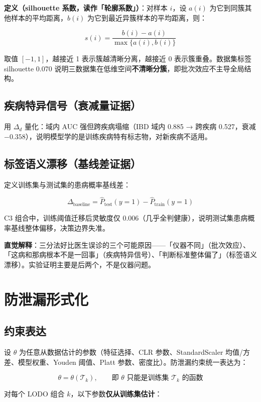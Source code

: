 \documentclass{internal-report}
\begin{document}
\textbf{定义（silhouette 系数，读作「轮廓系数」）}：对样本 $i$，设 $a(i)$ 为它到同簇其他样本的平均距离，$b(i)$ 为它到最近异簇样本的平均距离，则：

$$
s(i) = \frac{b(i) - a(i)}{\max\{a(i), b(i)\}}
$$

取值 $[-1,1]$，越接近 1 表示簇越清晰分离，越接近 0 表示簇重叠。数据集标签 silhouette 0.070 说明三数据集在低维空间\textbf{不清晰分簇}，即批次效应不主导全局结构。

\subsection{疾病特异信号（衰减量证据）}

用 $\Delta_d$ 量化：域内 AUC 强但跨疾病塌缩（IBD 域内 0.885 → 跨疾病 0.527，衰减 $-0.358$），说明模型学的是训练疾病特有标志物，对新疾病不适用。

\subsection{标签语义漂移（基线差证据）}

定义训练集与测试集的患病概率基线差：

$$
\Delta_{\text{baseline}} = \hat{P}_{\text{test}}(y=1) - \hat{P}_{\text{train}}(y=1)
$$

C3 组合中，训练阈值迁移后灵敏度仅 0.006（几乎全判健康），说明测试集患病概率基线整体偏移，决策边界失准。

\textbf{直觉解释}：三分法好比医生误诊的三个可能原因——「仪器不同」（批次效应）、「这病和那病根本不是一回事」（疾病特异信号）、「判断标准整体偏了」（标签语义漂移）。实验证明主要是后两个，不是仪器问题。

\section{防泄漏形式化}

\subsection{约束表达}

设 $\theta$ 为任意从数据估计的参数（特征选择、CLR 参数、StandardScaler 均值/方差、模型权重、Youden 阈值、Platt 参数、密度比）。防泄漏约束统一表达为：

$$
\theta = \theta(\mathcal{T}_k), \qquad \text{即 } \theta \text{ 只能是训练集 } \mathcal{T}_k \text{ 的函数}
$$

对每个 LODO 组合 $k$，以下参数\textbf{仅从训练集估计}：
\end{document}
